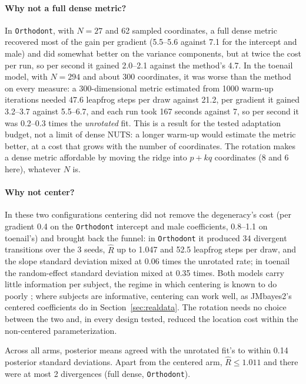 \paragraph{Why not a full dense metric?} In \texttt{Orthodont}, with
$N = 27$ and 62 sampled coordinates, a full dense metric recovered
most of the gain per gradient (5.5--5.6 against 7.1 for the intercept and
male) and did somewhat better on the variance components, but at twice the
cost per run, so per second it gained 2.0--2.1 against the method's 4.7.
In the toenail model, with $N = 294$ and about 300 coordinates, it was worse than the method on every measure: a 300-dimensional metric estimated from 1000
warm-up iterations needed 47.6 leapfrog steps per draw against 21.2, per
gradient it gained 3.2--3.7 against 5.5--6.7, and each run took 167
seconds against 7, so per second it was 0.2--0.3 times the \emph{unrotated}
fit. This is a result for the tested adaptation budget, not a limit of
dense NUTS: a longer warm-up would estimate the metric better, at a cost
that grows with the number of coordinates. The rotation makes a dense
metric affordable by moving the ridge into $p + kq$ coordinates (8 and 6
here), whatever $N$ is.

\paragraph{Why not center?} In these two configurations centering did
not remove the degeneracy's cost (per gradient 0.4 on the
\texttt{Orthodont} intercept and male coefficients, 0.8--1.1 on
toenail's) and brought back the funnel: in \texttt{Orthodont} it produced
34 divergent transitions over the 3 seeds, $\hat R$ up to 1.047 and 52.5
leapfrog steps per draw, and the slope standard deviation mixed at 0.06
times the unrotated rate; in toenail the random-effect standard deviation
mixed at 0.35 times. Both models carry little information per subject,
the regime in which centering is known to do poorly
\citep{gelfand1995,browne2009}; where subjects are informative, centering
can work well, as JMbayes2's centered coefficients do in
Section~\ref{sec:realdata}. The rotation needs no choice between the two
and, in every design tested, reduced the location cost within the
non-centered parameterization.

Across all arms, posterior means agreed with the unrotated fit's to within
0.14 posterior standard deviations. Apart from the centered arm, $\hat R
\leq 1.011$ and there were at most 2 divergences (full dense, \texttt{Orthodont}).
